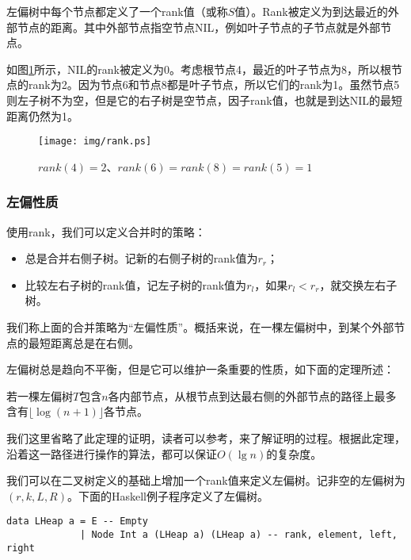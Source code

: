 \documentclass[UTF8]{article}
\begin{document}
左偏树中每个节点都定义了一个rank值（或称$S$值）。Rank被定义为到达最近的外部节点的距离。其中外部节点指空节点NIL，例如叶子节点的子节点就是外部节点。

如图\ref{fig:rank}所示，NIL的rank被定义为0。考虑根节点4，最近的叶子节点为8，所以根节点的rank为2。因为节点6和节点8都是叶子节点，所以它们的rank为1。虽然节点5则左子树不为空，但是它的右子树是空节点，因子rank值，也就是到达NIL的最短距离仍然为1。

\begin{figure}[htbp]
   \begin{center}
     \texttt{[image: img/rank.ps]}
     \caption{$rank(4) = 2$、$rank(6) = rank(8) = rank(5) = 1$} \label{fig:rank}
   \end{center}
\end{figure}

\subsubsection{左偏性质}

使用rank，我们可以定义合并时的策略：

\begin{itemize}
\item 总是合并右侧子树。记新的右侧子树的rank值为$r_r$；
\item 比较左右子树的rank值，记左子树的rank值为$r_l$，如果$r_l < r_r$，就交换左右子树。
\end{itemize}

我们称上面的合并策略为“左偏性质”。概括来说，在一棵左偏树中，到某个外部节点的最短距离总是在右侧。

左偏树总是趋向不平衡，但是它可以维护一条重要的性质，如下面的定理所述：

\begin{theorem}
若一棵左偏树$T$包含$n$各内部节点，从根节点到达最右侧的外部节点的路径上最多含有$\lfloor \log (n+1) \rfloor$各节点。
\end{theorem}

我们这里省略了此定理的证明，读者可以参考\cite{brono-book}，\cite{TAOCP}来了解证明的过程。根据此定理，沿着这一路径进行操作的算法，都可以保证$O(\lg n)$的复杂度。

我们可以在二叉树定义的基础上增加一个rank值来定义左偏树。记非空的左偏树为$(r, k, L, R)$。下面的Haskell例子程序定义了左偏树。

\lstset{language=Haskell}
\begin{lstlisting}
data LHeap a = E -- Empty
             | Node Int a (LHeap a) (LHeap a) -- rank, element, left, right
\end{lstlisting}
\end{document}
